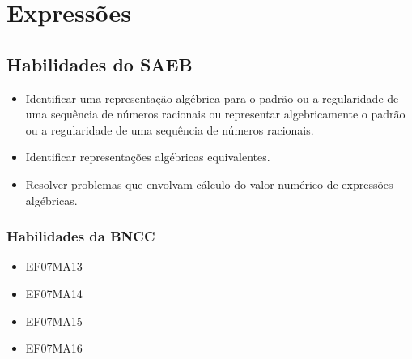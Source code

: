 \chapter{Expressões}

\section*{Habilidades do SAEB }
\begin{itemize}
\item Identificar uma representação algébrica para o
padrão ou a regularidade de uma sequência de números racionais ou
representar algebricamente o padrão ou a regularidade de uma sequência
de números racionais.
\item
  Identificar representações algébricas equivalentes.
\item
  Resolver problemas que envolvam cálculo do valor numérico de
  expressões algébricas.
\end{itemize}

\subsection{Habilidades da BNCC}

\begin{itemize}
  \item EF07MA13
  \item EF07MA14
  \item EF07MA15
  \item EF07MA16
\end{itemize}


